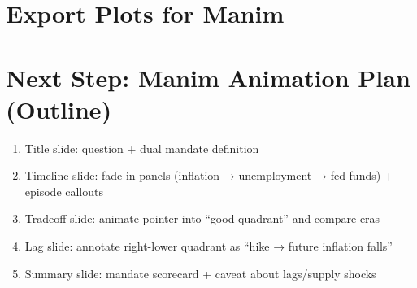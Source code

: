 \documentclass[
  11pt,
]{article}
\providecommand{\tightlist}{%
  \setlength{\itemsep}{0pt}\setlength{\parskip}{0pt}}
\begin{document}
\section{Export Plots for Manim}\label{export-plots-for-manim}

\section{Next Step: Manim Animation Plan
(Outline)}\label{next-step-manim-animation-plan-outline}

\begin{enumerate}
\def\labelenumi{\arabic{enumi}.}
\tightlist
\item
  Title slide: question + dual mandate definition\\
\item
  Timeline slide: fade in panels (inflation → unemployment → fed funds)
  + episode callouts\\
\item
  Tradeoff slide: animate pointer into ``good quadrant'' and compare
  eras\\
\item
  Lag slide: annotate right-lower quadrant as ``hike → future inflation
  falls''\\
\item
  Summary slide: mandate scorecard + caveat about lags/supply shocks
\end{enumerate}
\end{document}
